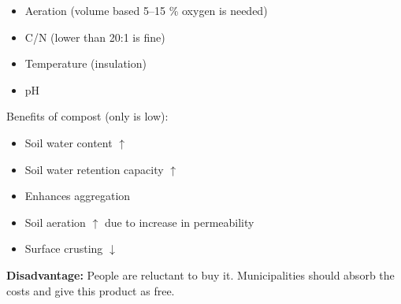 \documentclass{article}
\numberwithin{equation}{section}
\begin{document}
\begin{enumerate} [start=2]
\begin{itemize}
        \item Aeration (volume based 5--15 \% oxygen is needed)
        \item C/N (lower than 20:1 is fine)
        \item Temperature (insulation)
        \item pH
    \end{itemize}
    Benefits of compost (only  is low):
    \begin{itemize}
        \item Soil water content $\uparrow$
        \item Soil water retention capacity $\uparrow$
        \item Enhances aggregation
        \item Soil aeration $\uparrow$ due to increase in permeability
        \item Surface crusting $\downarrow$
    \end{itemize}
    \textbf{Disadvantage:} People are reluctant to buy it. Municipalities should absorb the costs and give this product as free.
\end{enumerate}
\end{document}
